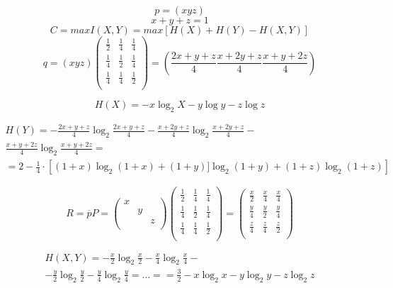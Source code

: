 \documentclass[12pt]{article}
\begin{document}
$$p = (x y z ) $$
$$ x+y+z = 1 $$
$$ C = max I(X,Y) = max [H(X) + H(Y) - H(X,Y) ] $$ 
$$q=(x y z ) 
\begin{pmatrix}
    \frac{1}{2} & \frac{1}{4} & \frac{1}{4} \\
    \frac{1}{4} & \frac{1}{2} & \frac{1}{4} \\
    \frac{1}{4} & \frac{1}{4} & \frac{1}{2} \\
\end{pmatrix}
= \left( \frac{2x+y+z}{4} \frac{x+2y+z}{4} \frac{x + y +2z}{4}  \right)
$$ 


$$ H(X) = -x \log_2 X - y\log y - z \log z $$ 

\begin{multline*}
H(Y) =  -\frac{2x+y+z}{4}\log_2 \frac{2x+y+z}{4} - \frac{x+2y+z}{4}\log_2 \frac{x+2y+z}{4} - \\
    \frac{x + y +2z}{4}\log_2 \frac{x + y +2z}{4} = \\
    = 2 - \frac{1}{4}\cdot\left[(1+x)\log_2(1+x) + (1+y)]\log_2(1+y)+(1+z)\log_2(1+z) \right]
\end{multline*}

$$
R =\overline{p}P=
\begin{pmatrix}
    x &    &  \\
      & y  &  \\
      &    & z \\
\end{pmatrix}
\begin{pmatrix}
    \frac{1}{2} & \frac{1}{4} & \frac{1}{4} \\
    \frac{1}{4} & \frac{1}{2} & \frac{1}{4} \\
    \frac{1}{4} & \frac{1}{4} & \frac{1}{2} \\
\end{pmatrix}
= 
\begin{pmatrix}
    \frac{x}{2} & \frac{x}{4} & \frac{x}{4} \\
    \frac{y}{4} & \frac{y}{2} & \frac{y}{4} \\
    \frac{z}{4} & \frac{z}{4} & \frac{z}{2} \\
\end{pmatrix}
$$

\begin{multline*}
H(X,Y) =  -\frac{x}{2}\log_2\frac{x}{2}-\frac{x}{4}\log_2\frac{x}{4} - \\
 -\frac{y}{2}\log_2\frac{y}{2}-\frac{y}{4}\log_2\frac{y}{4} = \dots = 
    = \frac{3}{2}-x\log_2x-y\log_2y-z\log_2z
\end{multline*}
\end{document}
